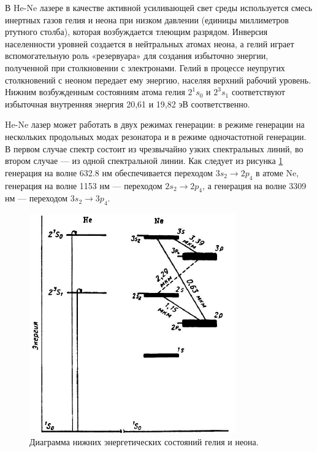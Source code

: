 \documentclass[12pt, russian, a4paper]{article}
\begin{document}
	
	\setcounter{page}{2}



	В He-Ne лазере в качестве активной усиливающей свет среды используется смесь инертных газов гелия и неона при низком давлении (единицы миллиметров ртутного столба), которая возбуждается тлеющим разрядом. Инверсия населенности уровней создается в нейтральных атомах неона, а гелий играет вспомогательную роль «резервуара» для создания избыточно энергии, полученной при столкновении с электронами. Гелий в процессе неупругих столкновений с неоном передает ему энергию, населяя верхний рабочий уровень. Нижним возбужденным состояниям атома гелия $2^1s_0$ и $2^3s_1$ соответствуют избыточная внутренняя энергия 20,61 и 19,82 эВ соответственно.

	He-Ne лазер может работать в двух режимах генерации: в режиме  генерации на нескольких продольных модах резонатора и в режиме одночастотной генерации. В первом случае спектр состоит из чрезвычайно узких спектральных линий, во втором случае --- из одной спектральной линии. Как следует из рисунка \ref{fig:he-ne-enrgy} генерация на волне 632.8 нм обеспечивается переходом $3s_2\rightarrow2p_4$ в атоме Ne, генерация на волне 1153 нм --- переходом $2s_2\rightarrow2p_4$, а генерация на волне 3309 нм --- переходом $3s_2\rightarrow3p_4$.

	\begin{figure}[htbp]
		\centering
		\includegraphics[scale=0.8]{../images/he-ne-enrgy.png}
		\caption{Диаграмма нижних энергетических состояний гелия и неона.}
		\label{fig:he-ne-enrgy}
	\end{figure}
\end{document}
